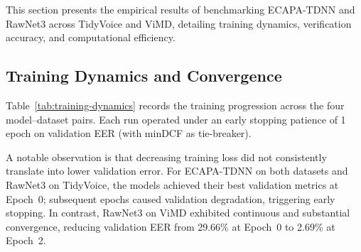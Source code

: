 This section presents the empirical results of benchmarking ECAPA-TDNN and RawNet3 across TidyVoice and ViMD, detailing training dynamics, verification accuracy, and computational efficiency.

\subsection{Training Dynamics and Convergence}

Table~\ref{tab:training-dynamics} records the training progression across the four model--dataset pairs. Each run operated under an early stopping patience of 1 epoch on validation EER (with minDCF as tie-breaker).

\begin{table}[H]
\centering
{}
\caption{Training progression and checkpoint selection across four experimental runs.}
\label{tab:training-dynamics}
\end{table}

A notable observation is that decreasing training loss did not consistently translate into lower validation error. For ECAPA-TDNN on both datasets and RawNet3 on TidyVoice, the models achieved their best validation metrics at Epoch~0; subsequent epochs caused validation degradation, triggering early stopping. In contrast, RawNet3 on ViMD exhibited continuous and substantial convergence, reducing validation EER from 29.66\% at Epoch~0 to 2.69\% at Epoch~2.

